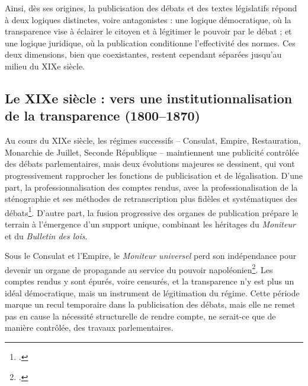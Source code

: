 Ainsi, dès ses origines, la publicisation des débats et des textes législatifs répond à deux logiques distinctes, voire antagonistes : une logique démocratique, où la transparence vise à éclairer le citoyen et à légitimer le pouvoir par le débat ; et une logique juridique, où la publication conditionne l’effectivité des normes. Ces deux dimensions, bien que coexistantes, restent cependant séparées jusqu’au milieu du XIXe siècle.

\subsection{Le XIXe siècle : vers une institutionnalisation de la transparence (1800–1870)}

Au cours du XIXe siècle, les régimes successifs – Consulat, Empire, Restauration, Monarchie de Juillet, Seconde République – maintiennent une publicité contrôlée des débats parlementaires, mais deux évolutions majeures se dessinent, qui vont progressivement rapprocher les fonctions de publicisation et de légalisation. D’une part, la professionnalisation des comptes rendus, avec la professionalisation de la sténographie et ses méthodes de retranscription plus fidèles et systématiques des débats\footcite[][]{gardey}. D’autre part, la fusion progressive des organes de publication prépare le terrain à l’émergence d’un support unique, combinant les héritages du \emph{Moniteur} et du \emph{Bulletin des lois}.

Sous le Consulat et l’Empire, le \emph{Moniteur universel} perd son indépendance pour devenir un organe de propagande au service du pouvoir napoléonien\footcite[][]{universalis}. Les comptes rendus y sont épurés, voire censurés, et la transparence n’y est plus un idéal démocratique, mais un instrument de légitimation du régime. Cette période marque un recul temporaire dans la publicisation des débats, mais elle ne remet pas en cause la nécessité structurelle de rendre compte, ne serait-ce que de manière contrôlée, des travaux parlementaires. 

